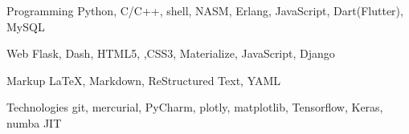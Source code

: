 


\begin{cvskills}


\cvskill
{Programming} %
{Python, C/C++, shell, NASM, Erlang, JavaScript, Dart(Flutter), MySQL} %


\cvskill
{Web} %
{Flask, Dash, HTML5, ,CSS3, Materialize, JavaScript, Django} %


\cvskill
{Markup} %
{\LaTeX, Markdown, ReStructured Text, YAML} %


\cvskill
{Technologies} %
{git, mercurial, PyCharm, plotly, matplotlib, Tensorflow, Keras, numba JIT } %


\end{cvskills}
